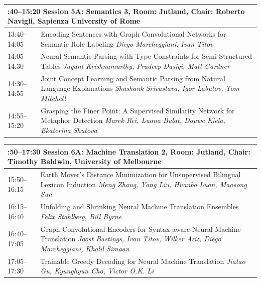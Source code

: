 \documentclass{book}
\renewcommand{\large}{\fontsize{36}{40}\selectfont}
\begin{document}
\begin{tabular}{p{3in}p{16in}}
  \multicolumn{2}{p{\textwidth}}{\bfseries\large 13:40--15:20 Session 5A: Semantics 3, Room:  Jutland, Chair:  Roberto Navigli, Sapienza University of Rome} \\\hline

    
    13:40--14:05
    &	Encoding Sentences with Graph Convolutional Networks for Semantic Role Labeling \newline 
    {\itshape Diego Marcheggiani, Ivan Titov} \\
    
    14:05--14:30
    &	Neural Semantic Parsing with Type Constraints for Semi-Structured Tables \newline 
    {\itshape Jayant Krishnamurthy, Pradeep Dasigi, Matt Gardner} \\
    
    14:30--14:55
    &	Joint Concept Learning and Semantic Parsing from Natural Language Explanations \newline 
    {\itshape Shashank Srivastava, Igor Labutov, Tom Mitchell} \\
    
    14:55--15:20
    &	Grasping the Finer Point: A Supervised Similarity Network for Metaphor Detection \newline 
    {\itshape Marek Rei, Luana Bulat, Douwe Kiela, Ekaterina Shutova} \\
    
\end{tabular}

\begin{tabular}{p{3in}p{16in}}
  \multicolumn{2}{p{\textwidth}}{\bfseries\large 15:50--17:30 Session 6A: Machine Translation 2, Room:  Jutland, Chair:  Timothy Baldwin, University of Melbourne} \\\hline

    
    15:50--16:15
    &	Earth Mover's Distance Minimization for Unsupervised Bilingual Lexicon Induction \newline 
    {\itshape Meng Zhang, Yang Liu, Huanbo Luan, Maosong Sun} \\
    
    16:15--16:40
    &	Unfolding and Shrinking Neural Machine Translation Ensembles \newline 
    {\itshape Felix Stahlberg, Bill Byrne} \\
    
    16:40--17:05
    &	Graph Convolutional Encoders for Syntax-aware Neural Machine Translation \newline 
    {\itshape Joost Bastings, Ivan Titov, Wilker Aziz, Diego Marcheggiani, Khalil Simaan} \\
    
    17:05--17:30
    &	Trainable Greedy Decoding for Neural Machine Translation \newline 
    {\itshape Jiatao Gu, Kyunghyun Cho, Victor O.K. Li} \\
    
\end{tabular}
\end{document}
